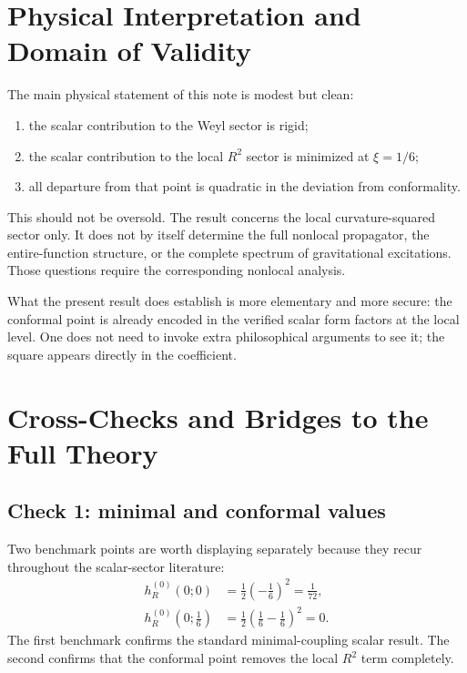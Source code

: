 \documentclass[11pt,a4paper]{article}
\theoremstyle{definition}
\theoremstyle{remark}
\begin{document}
\section{Physical Interpretation and Domain of Validity}
\label{sec:interpretation}

The main physical statement of this note is modest but clean:
\begin{enumerate}[label=(\roman*)]
  \item the scalar contribution to the Weyl sector is rigid;
  \item the scalar contribution to the local $R^2$ sector is minimized at
  $\xi = 1/6$;
  \item all departure from that point is quadratic in the deviation from
  conformality.
\end{enumerate}

This should not be oversold.  The result concerns the local curvature-squared
sector only.  It does not by itself determine the full nonlocal propagator,
the entire-function structure, or the complete spectrum of gravitational
excitations.  Those questions require the corresponding nonlocal analysis.

What the present result does establish is more elementary and more secure:
the conformal point is already encoded in the verified scalar form factors at
the local level.  One does not need to invoke extra philosophical arguments
to see it; the square appears directly in the coefficient.

\section{Cross-Checks and Bridges to the Full Theory}
\label{sec:checks}

\subsection{Check 1: minimal and conformal values}

Two benchmark points are worth displaying separately because they recur
throughout the scalar-sector literature:
\begin{align}
  h_R^{(0)}(0;0)
  &= \frac{1}{2}\left(-\frac{1}{6}\right)^2
   = \frac{1}{72},
  \label{eq:check-minimal}\\[4pt]
  h_R^{(0)}\!\left(0;\frac{1}{6}\right)
  &= \frac{1}{2}\left(\frac{1}{6}-\frac{1}{6}\right)^2
   = 0.
  \label{eq:check-conformal}
\end{align}
The first benchmark confirms the standard minimal-coupling scalar result. The
second confirms that the conformal point removes the local $R^2$ term
completely.
\end{document}
